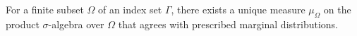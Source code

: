 For a finite subset $\Omega$ of an index set $\Gamma$, there exists a unique measure $\mu_{\Omega}$ on the product $\sigma$-algebra over $\Omega$ that agrees with prescribed marginal distributions.
